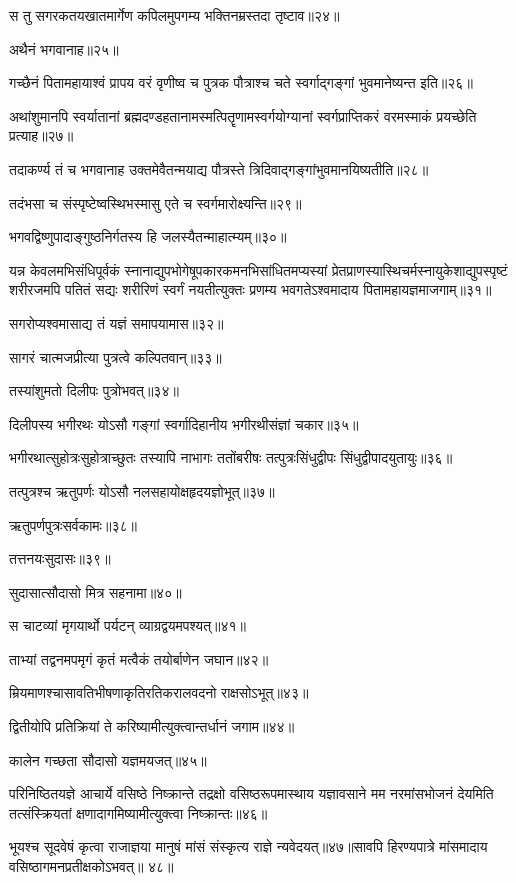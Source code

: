 स तु सगरकतयखातमार्गेण कपिलमुपगम्य भक्तिनम्रस्तदा तृष्टाव॥२४॥

अथैनं भगवानाह॥२५॥

गच्छैनं पितामहायाश्वं प्रापय वरं वृणीष्व च पुत्रक पौत्राश्च चते स्वर्गाद्गङ्गां भुवमानेष्यन्त
इति॥२६॥

अथांशुमानपि स्वर्यातानां ब्रह्मदण्डहतानामस्मत्पितॄणामस्वर्गयोग्यानां स्वर्गप्राप्तिकरं
वरमस्माकं प्रयच्छेति प्रत्याह॥२७॥

तदाकर्ण्य तं च भगवानाह उक्तमेवैतन्मयाद्य पौत्रस्ते त्रिदिवाद्गङ्गांभुवमानयिष्यतीति॥२८॥

तदंभसा च संस्पृष्टेष्वस्थिभस्मासु एते च स्वर्गमारोक्ष्यन्ति॥२९॥

भगवद्विष्णुपादाङ्गुष्ठनिर्गतस्य हि जलस्यैतन्माहात्म्यम्॥३०॥

यन्न केवलमभिसंधिपूर्वकं स्नानाद्युपभोगेषूपकारकमनभिसांधितमप्यस्यां
प्रेतप्राणस्यास्थिचर्मस्नायुकेशाद्युपस्पृष्टं शरीरजमपि पतितं सद्यः शरीरिणं स्वर्गं नयतीत्युक्तः
प्रणम्य भवगतेऽश्वमादाय पितामहायज्ञमाजगाम्॥३१॥

सगरोप्यश्वमासाद्य तं यज्ञं समापयामास॥३२॥

सागरं चात्मजप्रीत्या पुत्रत्वे कल्पितवान्॥३३॥

तस्यांशुमतो दिलीपः पुत्रोभवत्॥३४॥

दिलीपस्य भगीरथः योऽसौ गङ्गां स्वर्गादिहानीय भगीरथीसंज्ञां चकार॥३५॥

भगीरथात्सुहोत्रःसुहोत्राच्छुतः तस्यापि नाभागः ततोंबरीषः तत्पुत्रःसिंधुद्वीपः
सिंधुद्वीपादयुतायुः॥३६॥

तत्पुत्रश्च ऋतुपर्णः योऽसौ नलसहायोक्षहृदयज्ञोभूत्॥३७॥

ऋतुपर्णपुत्रःसर्वकामः॥३८॥

तत्तनयःसुदासः॥३९॥

सुदासात्सौदासो मित्र सहनामा॥४०॥

स चाटव्यां मृगयार्थो पर्यटन् व्याग्रद्वयमपश्यत्॥४१॥

ताभ्यां तद्वनमपमृगं कृतं मत्वैकं तयोर्बाणेन जघान॥४२॥

म्रियमाणश्चासावतिभीषणाकृतिरतिकरालवदनो राक्षसोऽभूत्॥४३॥

द्वितीयोपि प्रतिक्रियां ते करिष्यामीत्युक्त्वान्तर्धानं जगाम॥४४॥

कालेन गच्छता सौदासो यज्ञमयजत्॥४५॥

परिनिष्ठितयज्ञे आचार्ये वसिष्ठे निष्क्रान्ते तद्रक्षो वसिष्ठरूपमास्थाय यज्ञावसाने मम
नरमांसभोजनं देयमिति तत्संस्क्रियतां क्षणादागमिष्यामीत्युक्त्वा निष्क्रान्तः॥४६॥

भूयश्च सूदवेषं कृत्वा राजाज्ञया मानुषं मांसं संस्कृत्य राज्ञे न्यवेदयत्॥४७॥सावपि
हिरण्यपात्रे मांसमादाय वसिष्ठागमनप्रतीक्षकोऽभवत्॥ ४८॥

